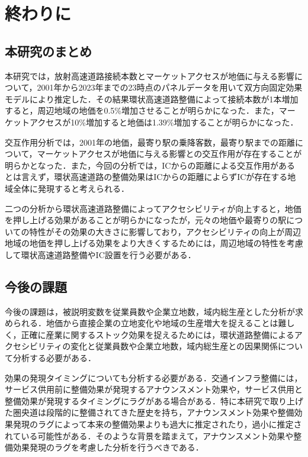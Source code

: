 \chapter{終わりに}

\section{本研究のまとめ}
本研究では，放射高速道路接続本数とマーケットアクセスが地価に与える影響について，2001年から2023年までの23時点のパネルデータを用いて双方向固定効果モデルにより推定した．その結果環状高速道路整備によって接続本数が1本増加すると，周辺地域の地価を0.5\%増加させることが明らかになった．また，マーケットアクセスが10\%増加すると地価は1.39\%増加することが明らかになった．

交互作用分析では，2001年の地価，最寄り駅の乗降客数，最寄り駅までの距離について，マーケットアクセスが地価に与える影響との交互作用が存在することが明らかとなった．また，今回の分析では，ICからの距離による交互作用があるとは言えず，環状高速道路の整備効果はICからの距離によらずICが存在する地域全体に発現すると考えられる．

二つの分析から環状高速道路整備によってアクセシビリティが向上すると，地価を押し上げる効果があることが明らかになったが，元々の地価や最寄りの駅についての特性がその効果の大きさに影響しており，アクセシビリティの向上が周辺地域の地価を押し上げる効果をより大きくするためには，周辺地域の特性を考慮して環状高速道路整備やIC設置を行う必要がある．
\section{今後の課題}
今後の課題は，被説明変数を従業員数や企業立地数，域内総生産とした分析が求められる．地価から直接企業の立地変化や地域の生産増大を捉えることは難しく，正確に産業に関するストック効果を捉えるためには，環状道路整備によるアクセシビリティの変化と従業員数や企業立地数，域内総生産との因果関係について分析する必要がある．

効果の発現タイミングについても分析する必要がある．交通インフラ整備には，サービス供用前に整備効果が発現するアナウンスメント効果や，サービス供用と整備効果が発現するタイミングにラグがある場合がある．特に本研究で取り上げた圏央道は段階的に整備されてきた歴史を持ち，アナウンスメント効果や整備効果発現のラグによって本来の整備効果よりも過大に推定されたり，過小に推定されている可能性がある．そのような背景を踏まえて，アナウンスメント効果や整備効果発現のラグを考慮した分析を行うべきである．